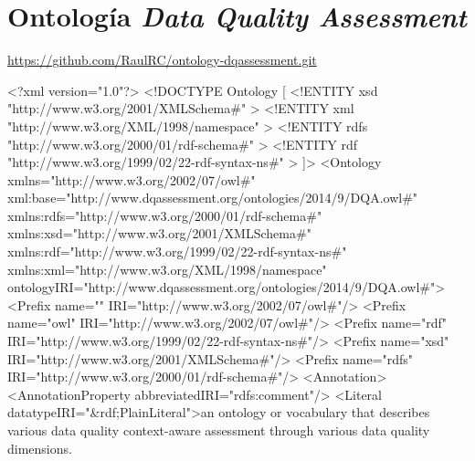 \chapter{Ontología \textit{Data Quality Assessment}}
\label{chap:ontologia}

\url{https://github.com/RaulRC/ontology-dqassessment.git}

\begin{listing}[
  language = XML,
  numbers=left,
  numberstyle=\tiny,
  stepnumber=5,
  numbersep=5pt,
  frame=single,
  caption  = {Vocabulario utilizado para los resultados finales},
  label    = code:onto-vocabulary]
<?xml version="1.0"?>
<!DOCTYPE Ontology [
    <!ENTITY xsd "http://www.w3.org/2001/XMLSchema#" >
    <!ENTITY xml "http://www.w3.org/XML/1998/namespace" >
    <!ENTITY rdfs "http://www.w3.org/2000/01/rdf-schema#" >
    <!ENTITY rdf "http://www.w3.org/1999/02/22-rdf-syntax-ns#" >
]>
<Ontology xmlns="http://www.w3.org/2002/07/owl#"
     xml:base="http://www.dqassessment.org/ontologies/2014/9/DQA.owl#"
     xmlns:rdfs="http://www.w3.org/2000/01/rdf-schema#"
     xmlns:xsd="http://www.w3.org/2001/XMLSchema#"
     xmlns:rdf="http://www.w3.org/1999/02/22-rdf-syntax-ns#"
     xmlns:xml="http://www.w3.org/XML/1998/namespace"
     ontologyIRI="http://www.dqassessment.org/ontologies/2014/9/DQA.owl#">
    <Prefix name="" IRI="http://www.w3.org/2002/07/owl#"/>
    <Prefix name="owl" IRI="http://www.w3.org/2002/07/owl#"/>
    <Prefix name="rdf" IRI="http://www.w3.org/1999/02/22-rdf-syntax-ns#"/>
    <Prefix name="xsd" IRI="http://www.w3.org/2001/XMLSchema#"/>
    <Prefix name="rdfs" IRI="http://www.w3.org/2000/01/rdf-schema#"/>
    <Annotation>
        <AnnotationProperty abbreviatedIRI="rdfs:comment"/>
        <Literal datatypeIRI="&rdf;PlainLiteral">an ontology or vocabulary that describes various data quality context-aware assessment through various data quality dimensions. 


\end{listing}
